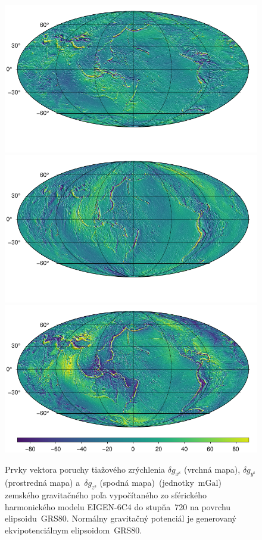 \documentclass[a4paper,12pt]{book}
\begin{document}
\begin{figure}
\centering
\includegraphics{./fig-gravity-disturbance-on-grs80-x.pdf}
\includegraphics{./fig-gravity-disturbance-on-grs80-y.pdf}
\includegraphics{./fig-gravity-disturbance-on-grs80-z.pdf}
\caption{Prvky vektora poruchy tiažového zrýchlenia $\delta g_{x^\mathrm{s}}$ 
(vrchná mapa), $\delta g_{y^\mathrm{s}}$ (prostredná mapa) a~$\delta 
g_{z^\mathrm{s}}$ (spodná mapa)~(jednotky~$\mathrm{mGal}$) zemského 
gravitačného poľa vypočítaného zo sférického harmonického modelu EIGEN-6C4 do 
stupňa~720 na povrchu elipsoidu~GRS80.  Normálny gravitačný potenciál je 
generovaný ekvipotenciálnym elipsoidom~GRS80.}
\label{fig:dg_ggm_grs80}
\end{figure}
\end{document}
